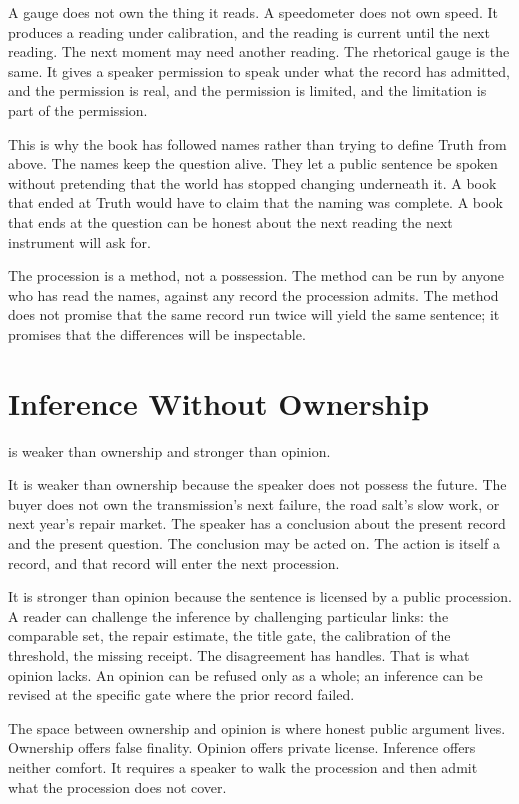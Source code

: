 A gauge does not own the thing it reads. A speedometer does not own
speed. It produces a reading under calibration, and the reading is
current until the next reading. The next moment may need another
reading. The rhetorical gauge is the same. It gives a speaker
permission to speak under what the record has admitted, and the
permission is real, and the permission is limited, and the limitation
is part of the permission.

This is why the book has followed names rather than trying to define
Truth from above. The names keep the question alive. They let a public
sentence be spoken without pretending that the world has stopped
changing underneath it. A book that ended at Truth would have to claim
that the naming was complete. A book that ends at the question can be
honest about the next reading the next instrument will ask for.

The procession is a method, not a possession. The method can be run by
anyone who has read the names, against any record the procession
admits. The method does not promise that the same record run twice
will yield the same sentence; it promises that the differences will be
inspectable.

\section{Inference Without Ownership}
\label{se:inference-without-ownership}

 is weaker than ownership and stronger than opinion.

It is weaker than ownership because the speaker does not possess the
future. The buyer does not own the transmission's next failure, the
road salt's slow work, or next year's repair market. The speaker has a
conclusion about the present record and the present question. The
conclusion may be acted on. The action is itself a record, and that
record will enter the next procession.

It is stronger than opinion because the sentence is licensed by a
public procession. A reader can challenge the inference by challenging
particular links: the comparable set, the repair estimate, the title
gate, the calibration of the threshold, the missing receipt. The
disagreement has handles. That is what opinion lacks. An opinion can
be refused only as a whole; an inference can be revised at the
specific gate where the prior record failed.

The space between ownership and opinion is where honest public
argument lives. Ownership offers false finality. Opinion offers private
license. Inference offers neither comfort. It requires a speaker to
walk the procession and then admit what the procession does not cover.

